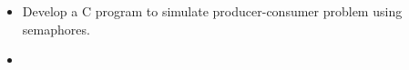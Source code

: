 \documentclass{article}
\newcommand{\question}[2]{
	\item [#1.] #2
}
\newcommand{\answer}[1]{\item [$\rightarrow$] \inputminted{c}{#1}}
\begin{document}
	\begin{itemize}
		\question{3}{Develop a C program to simulate producer-consumer problem using semaphores.}

		\answer{lab3.c}
	\end{itemize}
\end{document}
